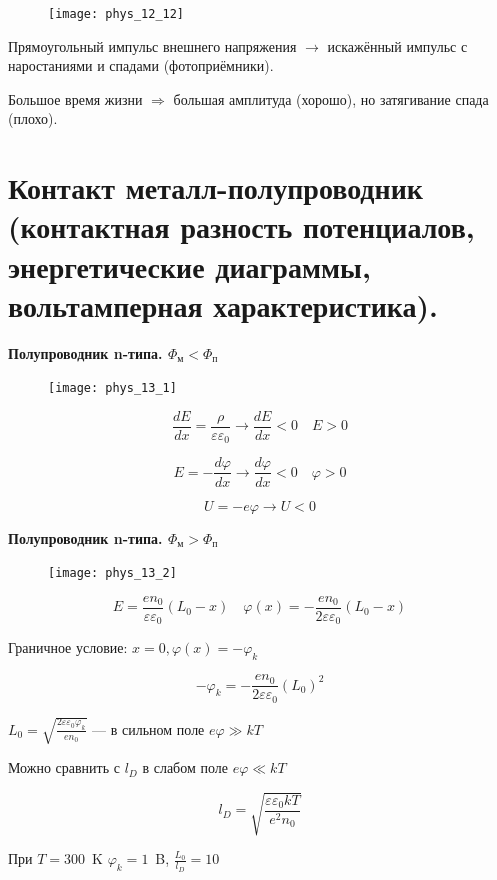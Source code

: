 \begin{figure}[h!]
    \centering
    \texttt{[image: phys\_12\_12]}
\end{figure}

Прямоугольный импульс внешнего напряжения $\rightarrow$ искажённый импульс с наростаниями и спадами (фотоприёмники).

Большое время жизни $\Rightarrow$ большая амплитуда (хорошо), но затягивание спада (плохо).

\section{Контакт металл-полупроводник (контактная разность потенциалов, энергетические диаграммы, вольтамперная характеристика).}

\textbf{Полупроводник n-типа. $\Phi_\text{м}<\Phi_\text{п}$}

\begin{figure}[h!]
    \centering
    \texttt{[image: phys\_13\_1]}
\end{figure}

$$
\frac{d E}{d x}=\frac{\rho}{\varepsilon \varepsilon_0} \rightarrow \frac{d E}{d x}<0 \quad E>0
$$


$$
E=-\frac{d \varphi}{d x} \rightarrow \frac{d \varphi}{d x}<0 \quad \varphi>0
$$

$$
U=-e \varphi \rightarrow U<0
$$

\textbf{Полупроводник n-типа. $\Phi_\text{м}>\Phi_\text{п}$}


\begin{figure}[h!]
    \centering
    \texttt{[image: phys\_13\_2]}
\end{figure}

$$
E=\frac{e n_0}{\varepsilon \varepsilon_0}\left(L_0-x\right) \quad \varphi(x)=-\frac{e n_0}{2 \varepsilon \varepsilon_0}\left(L_0-x\right)
$$

Граничное условие: $x=0, \varphi(x)=-\varphi_k$

$$
-\varphi_k=-\frac{e n_0}{2 \varepsilon \varepsilon_0}\left(L_0\right)^2
$$

$\displaystyle L_0=\sqrt{\frac{2 \varepsilon \varepsilon_0 \varphi_k}{e n_0}}$ --- в сильном поле $e\varphi \gg kT$


Можно сравнить с $l_D$ в слабом поле $e\varphi \ll kT$ 

$$
l_D=\sqrt{\frac{\varepsilon \varepsilon_0 k T}{e^2 n_0}}
$$

При $T=300$~K $\varphi_k=1$~B, $\frac{L_0}{l_D}=10$


